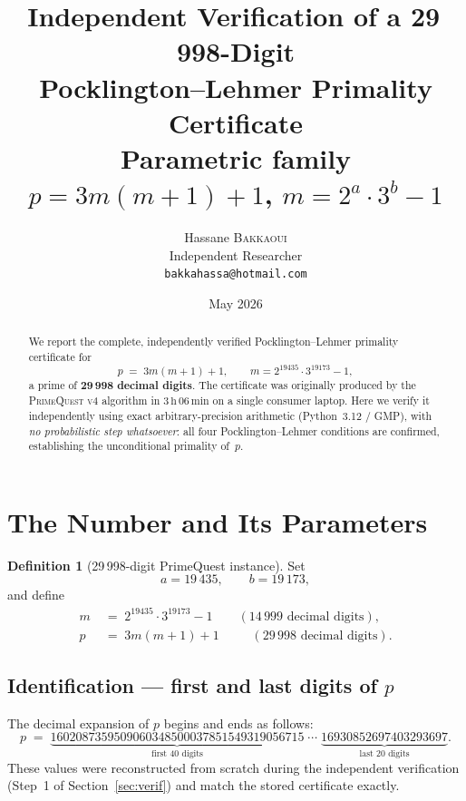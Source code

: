 \documentclass[11pt,a4paper]{article}
\title{Independent Verification of a 29\,998-Digit\\
       Pocklington--Lehmer Primality Certificate\\[6pt]
       {\large Parametric family $p = 3m(m+1)+1$,\;
               $m = 2^a\cdot 3^b - 1$}}
\author{Hassane \textsc{Bakkaoui}\\
\small Independent Researcher\\
\small \texttt{bakkahassa@hotmail.com}}
\date{May 2026}
\theoremstyle{definition}
\newtheorem{definition}{Definition}
\theoremstyle{remark}
\begin{document}
\maketitle
\thispagestyle{empty}

\begin{abstract}
We report the complete, independently verified Pocklington--Lehmer primality
certificate for
\[
  p \;=\; 3m(m+1)+1, \qquad m = 2^{19435}\cdot 3^{19173}-1,
\]
a prime of $\mathbf{29\,998}$ \textbf{decimal digits}.
The certificate was originally produced by the \textsc{PrimeQuest v4}
algorithm in $3\,\text{h}\,06\,\text{min}$ on a single consumer laptop.
Here we verify it independently using exact arbitrary-precision arithmetic
(Python~3.12 / GMP), with \emph{no probabilistic step whatsoever}:
all four Pocklington--Lehmer conditions are confirmed, establishing the
unconditional primality of~$p$.
\end{abstract}

\tableofcontents
\newpage

\section{The Number and Its Parameters}

\begin{definition}[29\,998-digit PrimeQuest instance]
\label{def:instance}
Set
\[
  a = 19\,435, \qquad b = 19\,173,
\]
and define
\begin{align*}
  m &\;=\; 2^{19435}\cdot 3^{19173} - 1
       \qquad (14\,999 \text{ decimal digits}),\\
  p &\;=\; 3m(m+1)+1
       \qquad\;\; (29\,998 \text{ decimal digits}).
\end{align*}
\end{definition}

\subsection*{Identification --- first and last digits of $p$}

The decimal expansion of $p$ begins and ends as follows:
\begin{equation}
\label{eq:pdigits}
  p \;=\;
  \underbrace{1602087359509060348500037851549319056715}_{\text{first 40 digits}}
  \;\cdots\;
  \underbrace{16930852697403293697}_{\text{last 20 digits}}.
\end{equation}
These values were reconstructed from scratch during the independent
verification (Step~1 of Section~\ref{sec:verif}) and match the stored
certificate exactly.
\end{document}
